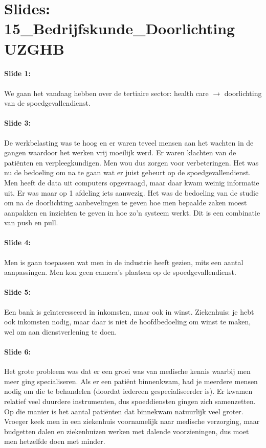 \documentclass[10pt,a4paper]{report}
\begin{document}
\section{Slides: 15\_Bedrijfskunde\_Doorlichting UZGHB}

\paragraph{Slide 1:} We gaan het vandaag hebben over de tertiaire sector: health care $\rightarrow$ doorlichting van de spoedgevallendienst.

\paragraph{Slide 3:} De werkbelasting was te hoog en er waren teveel mensen aan het wachten in de gangen waardoor het werken vrij moeilijk werd. Er waren klachten van de pati\"enten en verpleegkundigen. Men wou dus zorgen voor verbeteringen. Het was nu de bedoeling om na te gaan wat er juist gebeurt op de spoedgevallendienst. Men heeft de data uit computers opgevraagd, maar daar kwam weinig informatie uit. Er was maar op 1 afdeling iets aanwezig. Het was de bedoeling van de studie om na de doorlichting aanbevelingen te geven hoe men bepaalde zaken moest aanpakken en inzichten te geven in hoe zo'n systeem werkt. Dit is een combinatie van push en pull.

\paragraph{Slide 4:} Men is gaan toepassen wat men in de industrie heeft gezien, mits een aantal aanpassingen. Men kon geen camera's plaatsen op de spoedgevallendienst. 

\paragraph{Slide 5:} Een bank is ge\"interesseerd in inkomsten, maar ook in winst. Ziekenhuis: je hebt ook inkomsten nodig, maar daar is niet de hoofdbedoeling om winst te maken, wel om aan dienstverlening te doen.

\paragraph{Slide 6:} Het grote probleem was dat er een groei was van medische kennis waarbij men meer ging specialiseren. Als er een pati\"ent binnenkwam, had je meerdere mensen nodig om die te behandelen (doordat iedereen gespecialiseerder is). Er kwamen relatief veel duurdere instrumenten, dus spoeddiensten gingen zich samenzetten. Op die manier is het aantal pati\"enten dat binnekwam natuurlijk veel groter. \\
Vroeger keek men in een ziekenhuis voornamelijk naar medische verzorging, maar budgetten dalen en ziekenhuizen werken met dalende voorzieningen, dus moet men hetzelfde doen met minder.
\end{document}

